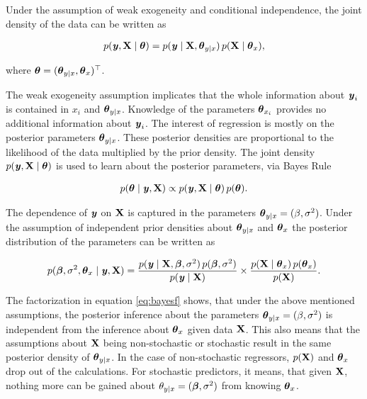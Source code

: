 \documentclass[11pt,a4paper,twoside]{book}
\begin{document}
Under the assumption of weak exogeneity and conditional independence, the joint density of the data can be written as

       \begin{align*} 
p({\textbf{\textit{y}}}, {\mathbf{X}} \mid {\boldsymbol{\theta}}{}) = p({\textbf{\textit{y}}} \mid {\mathbf{X}}, {\boldsymbol{\theta}}{}_{y \mid x}) \, p({\mathbf{X}} \mid {\boldsymbol{\theta}}{}_{x}),
   \end{align*}

where ${\boldsymbol{\theta}}{} = ({\boldsymbol{\theta}}{}_{y \mid x}, {\boldsymbol{\theta}}{}_{x})^\top$. 

The weak exogeneity assumption implicates that the whole information about ${\textbf{\textit{y}}}_{i}$ is contained in $x_{i}$ and ${\boldsymbol{\theta}}{}_{y \mid x}$. Knowledge of the parameters ${\boldsymbol{\theta}}{}_{x_{i}}$ provides no additional information about ${\textbf{\textit{y}}}_{i}$.
The interest of regression is mostly on the posterior parameters ${\boldsymbol{\theta}}{}_{y \mid x}$. These posterior densities are proportional to the likelihood of the data  multiplied by the prior density. The joint density $p({\textbf{\textit{y}}}, {\mathbf{X}} \mid  {\boldsymbol{\theta}}{})$ is used to learn about the posterior parameters, via Bayes Rule

       \begin{align*} 
p({\boldsymbol{\theta}}{} \mid {\textbf{\textit{y}}}, {\mathbf{X}}) \propto p({\textbf{\textit{y}}}, {\mathbf{X}} \mid  {\boldsymbol{\theta}}{}) \, p({\boldsymbol{\theta}}{}).
   \end{align*}
   
   The dependence of ${\textbf{\textit{y}}}$ on ${\mathbf{X}}$ is captured in the parameters ${\boldsymbol{\theta}}{}_{y \mid x} = (\beta, \sigma^2)$. Under the assumption of independent prior densities about ${\boldsymbol{\theta}}{}_{y \mid x}$ and ${\boldsymbol{\theta}}{}_{x}$ the posterior distribution of the parameters can be written as
   
          \begin{align} 
p({\boldsymbol{\beta}}, \sigma^2, {\boldsymbol{\theta}}{}_{x} \mid {\textbf{\textit{y}}}, {\mathbf{X}}) = \frac{p({\textbf{\textit{y}}} \mid {\mathbf{X}}, {\boldsymbol{\beta}}, \sigma^2) \, p({\boldsymbol{\beta}}, \sigma^2)}{p({\textbf{\textit{y}}} \mid {\mathbf{X}})} \times \frac{p({\mathbf{X}} \mid {\boldsymbol{\theta}}{}_{x}) \, p({\boldsymbol{\theta}}{}_{x})}{p({\mathbf{X}})}.  \label{eq:bayesf} 
   \end{align}
   
  The factorization in equation \ref{eq:bayesf} shows, that under the above mentioned assumptions, the posterior inference about the parameters ${\boldsymbol{\theta}}{}_{y \mid x} = (\beta, \sigma^2)$ is independent from the inference about ${\boldsymbol{\theta}}{}_{x}$ given data ${\mathbf{X}}$. This also means that the assumptions about ${\mathbf{X}}$ being non-stochastic or stochastic result in the same posterior density of  ${\boldsymbol{\theta}}{}_{y \mid x}$. In the case of non-stochastic regressors, $p({\mathbf{X}})$ and ${\boldsymbol{\theta}}{}_{x}$ drop out of the calculations. For stochastic predictors, it means, that given ${\mathbf{X}}$, nothing more can be gained about $\theta_{y \mid x} = ({\boldsymbol{\beta}}, \sigma^2)$ from knowing ${\boldsymbol{\theta}}{}_{x}$. 
  
\end{document}
